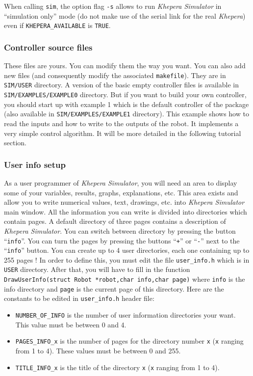 \documentclass[a4paper,twoside]{article}
\begin{document}
When calling {\tt sim}, the option flag {\tt -s} allows to run {\em Khepera
Simulator} in ``simulation only'' mode (do not make use of the serial link for
the real {\em Khepera}) even if {\tt KHEPERA\_AVAILABLE} is {\tt TRUE}.

\subsubsection{Controller source files}

These files are yours. You can modify them the way you want. You can also
add new files (and consequently modify the associated {\tt makefile}). They
are in {\tt SIM/USER} directory. A version of the basic empty controller files
is available in {\tt SIM/EXAMPLES/EXAMPLE0} directory. But if you want to build
your own controller, you should start up with example 1 which is the default
controller of the package (also available in {\tt SIM/EXAMPLES/EXAMPLE1}
directory). This example shows how to read the inputs and how to write to the
outputs of the robot. It implements a very simple control algorithm. It will
be more detailed in the following tutorial section.

\subsubsection{User info setup}

As a user programmer of {\em Khepera Simulator}, you will need an area to
display some of your variables, results, graphs, explanations, etc. This area
exists and allow you to write numerical values, text, drawings, etc. into {\em
Khepera Simulator} main window. All the information you can write is divided
into directories which contain pages. A default directory of three pages
contains a description of {\em Khepera Simulator}. You can switch between
directory by pressing the button ``{\tt info}''. You can turn the pages by
pressing the buttons ``{\tt +}'' or ``{\tt -}'' next to the ``{\tt info}''
button. You can create up to 4 user directories, each one containing up to 255
pages ! In order to define this, you must edit the file {\tt user\_info.h}
which is in {\tt USER} directory. After that, you will have to fill in the
function {\tt DrawUserInfo(struct Robot *robot,char info,char page)} where
{\tt info} is the info directory and {\tt page} is the current page of this
directory. Here are the constants to be edited in {\tt user\_info.h} header
file:

\begin{itemize}

\item {\tt NUMBER\_OF\_INFO} is the number of user information directories your
want. This value must be between 0 and 4.

\item {\tt PAGES\_INFO\_x} is the number of pages for the directory number
{\tt x} ({\tt x} ranging from 1 to 4). These values must be between 0 and 255.

\item {\tt TITLE\_INFO\_x} is the title of the directory {\tt x} ({\tt x}
ranging from 1 to 4).

\end{itemize}
\end{document}
